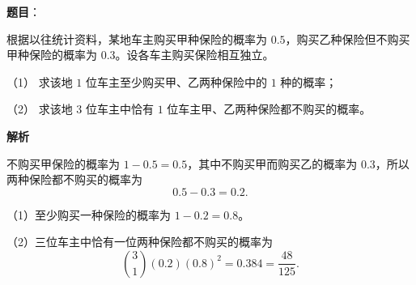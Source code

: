 \begin{answer}

\textbf{题目}：

根据以往统计资料，某地车主购买甲种保险的概率为 $0.5$，购买乙种保险但不购买甲种保险的概率为 $0.3$。设各车主购买保险相互独立。

（1） 求该地 $1$ 位车主至少购买甲、乙两种保险中的 $1$ 种的概率；

（2） 求该地 $3$ 位车主中恰有 $1$ 位车主甲、乙两种保险都不购买的概率。

\textbf{解析}


不购买甲保险的概率为 $1-0.5=0.5$，其中不购买甲而购买乙的概率为
$0.3$，所以两种保险都不购买的概率为
\nopagebreak[4]
\[
0.5-0.3=0.2.
\]


（1）至少购买一种保险的概率为 $1-0.2=0.8$。

（2）三位车主中恰有一位两种保险都不购买的概率为
\nopagebreak[4]
\[
\binom31(0.2)(0.8)^2=0.384=\frac{48}{125}.
\]



\end{answer}

